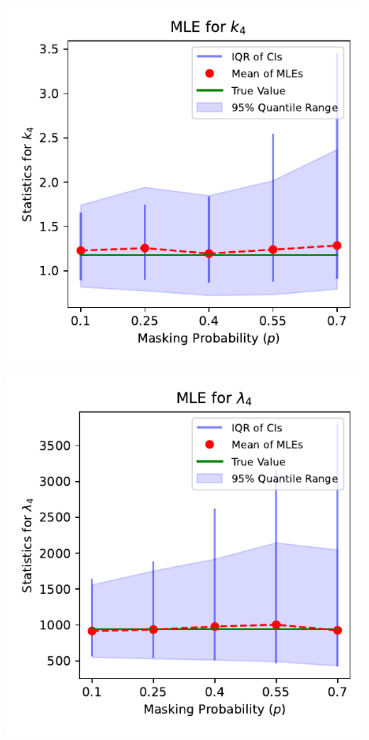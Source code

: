 \documentclass{article}
\begin{document}
\vspace{0.25mm}

\noindent
\begin{minipage}[t]{0.45\textwidth}
  \centering
  \includegraphics[width=\textwidth,height=0.33\textheight,keepaspectratio]{plot-p-vs-shape.4.pdf}
\end{minipage}%
\hspace{0.05\textwidth} %
\begin{minipage}[t]{0.45\textwidth}
  \centering
  \includegraphics[width=\textwidth,height=0.33\textheight,keepaspectratio]{plot-p-vs-scale.4.pdf}
\end{minipage}
\end{document}
